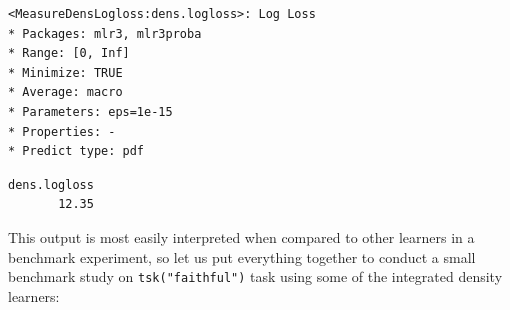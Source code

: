 \begin{Shaded}
\begin{Highlighting}[]
\OtherTok{=} \NormalTok{(}\NormalTok{)}
\end{Highlighting}
\end{Shaded}

\begin{verbatim}
<MeasureDensLogloss:dens.logloss>: Log Loss
* Packages: mlr3, mlr3proba
* Range: [0, Inf]
* Minimize: TRUE
* Average: macro
* Parameters: eps=1e-15
* Properties: -
* Predict type: pdf
\end{verbatim}

\begin{Shaded}
\begin{Highlighting}[]
\SpecialCharTok{$}
\end{Highlighting}
\end{Shaded}

\begin{verbatim}
dens.logloss 
       12.35 
\end{verbatim}

This output is most easily interpreted when compared to other learners
in a benchmark experiment, so let us put everything together to conduct
a small benchmark study on \texttt{tsk("faithful")} task using some of
the integrated density learners:

\begin{Shaded}
\begin{Highlighting}[]
\OtherTok{=} \NormalTok{(}\NormalTok{)}
\OtherTok{=} \NormalTok{(}\NormalTok{(}\NormalTok{, }\NormalTok{, }\NormalTok{))}
\OtherTok{=} \NormalTok{(}\NormalTok{)}
\OtherTok{=} \NormalTok{(}
  \NormalTok{(}\NormalTok{, } \NormalTok{)))}
\SpecialCharTok{$}
\end{Highlighting}
\end{Shaded}

